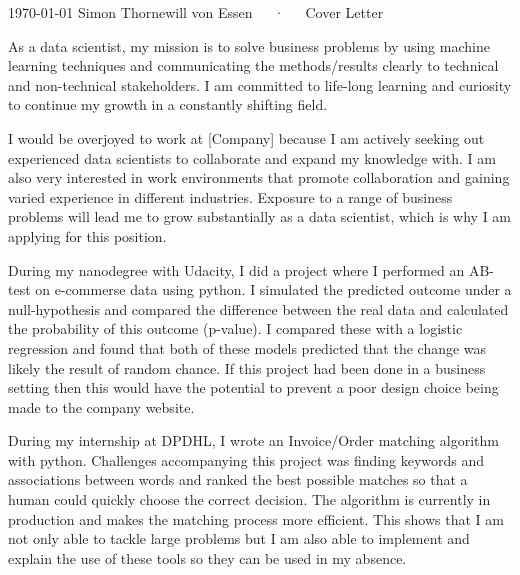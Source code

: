\documentclass[11pt, a4paper]{awesome-cv}
\begin{document}
\makecvheader[R]

\makecvfooter
  {\today}
  {Simon Thornewill von Essen~~~·~~~Cover Letter}
  {}

\makelettertitle

\begin{cvletter}

  As a data scientist, my mission is to solve business problems by using machine
  learning techniques and communicating the methods/results clearly to technical
  and non-technical stakeholders. I am committed to life-long learning and
  curiosity to continue my growth in a constantly shifting field.

  I would be overjoyed to work at [Company] because I am actively seeking out
  experienced data scientists to collaborate and expand my knowledge with. I am
  also very interested in work environments that promote collaboration and
  gaining varied experience in different industries. Exposure to a range of
  business problems will lead me to grow substantially as a data scientist,
  which is why I am applying for this position.

  During my nanodegree with Udacity, I did a project where I performed an
  AB-test on e-commerse data using python. I simulated the predicted outcome
  under a null-hypothesis and compared the difference between the real data and
  calculated the probability of this outcome (p-value). I compared these with a
  logistic regression and found that both of these models predicted that the
  change was likely the result of random chance. If this project had been done
  in a business setting then this would have the potential to prevent a poor
  design choice being made to the company website.

  During my internship at DPDHL, I wrote an Invoice/Order matching algorithm
  with python. Challenges accompanying this project was finding keywords and
  associations between words and ranked the best possible matches so that a
  human could quickly choose the correct decision. The algorithm is currently in
  production and makes the matching process more efficient. This shows that I am
  not only able to tackle large problems but I am also able to implement and
  explain the use of these tools so they can be used in my absence.


\end{cvletter}
\end{document}
